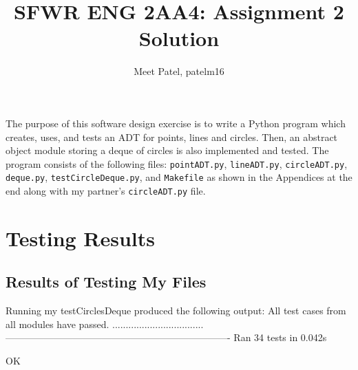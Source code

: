 \documentclass[12pt]{article}
\title{SFWR ENG 2AA4: Assignment 2 Solution}
\author{Meet Patel, patelm16}
\begin{document}
\maketitle

The purpose of this software design exercise is to write a Python program 
which creates, uses, and tests an ADT for points, lines and circles. 
Then, an abstract object module storing a deque of circles is also 
implemented and tested.
The program consists of the following files:
{\tt pointADT.py}, {\tt lineADT.py}, {\tt circleADT.py}, {\tt deque.py},
{\tt testCircleDeque.py}, and {\tt Makefile} as shown in the Appendices at the end along with my partner's {\tt circleADT.py} file. 

\newpage
\tableofcontents
\newpage

\section{Testing Results}
\subsection{Results of Testing My Files}

Running my testCirclesDeque produced the following output:
All test cases from all modules have passed.
..................................
----------------------------------------------------------------------
Ran 34 tests in 0.042s

OK
\end{document}
